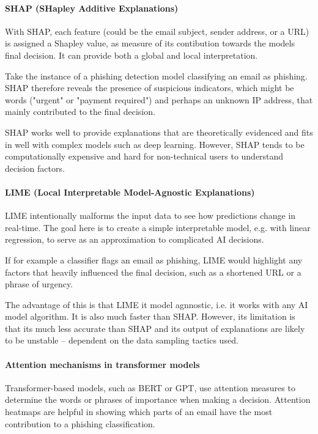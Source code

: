 \paragraph{SHAP (SHapley Additive Explanations)}
With SHAP, each feature (could be the email subject, sender address, or a URL) is assigned a Shapley value, as measure of its contibution towards the models final decision. It can provide both a global and local interpretation.\newline

\noindent Take the instance of a phishing detection model classifying an email as phishing. SHAP therefore reveals the presence of suspicious indicators, which might be words ("urgent" or "payment required") and perhaps an unknown IP address, that mainly contributed to the final decision.\newline

\noindent SHAP works well to provide explanations that are theoretically evidenced and fits in well with complex models such as deep learning. However, SHAP tends to be computationally expensive and hard for non-technical users to understand decision factors.

\paragraph{LIME (Local Interpretable Model-Agnostic Explanations)}
LIME intentionally malforms the input data to see how predictions change in real-time. The goal here is to create a simple interpretable model, e.g. with linear regression, to serve as an approximation to complicated AI decisions.\newline

\noindent If for example a classifier flags an email as phishing, LIME would highlight any factors that heavily influenced the final decision, such as a shortened URL or a phrase of urgency.\newline

\noindent The advantage of this is that LIME it model agnnostic, i.e. it works with any AI model algorithm. It is also much faster than SHAP. However, its limitation is that its much less accurate than SHAP and its output of explanations are likely to be unstable -- dependent on the data sampling tactics used.

\paragraph{Attention mechanisms in transformer models}
Transformer-based models, such as BERT or GPT, use attention measures to determine the words or phrases of importance when making a decision. Attention heatmaps are helpful in showing which parts of an email have the most contribution to a phishing classification.\newline

